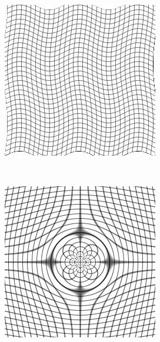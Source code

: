 \begin{figure}[H]
\begin{subfigure}[t]{0.3\textwidth}
	  \includegraphics[width=\textwidth]{figuras/gridSin.png}
	  \label{fig:ref-image}
	\end{subfigure} \\
	\begin{subfigure}[t]{0.3\textwidth}
	  \includegraphics[width=\textwidth]{figuras/gridDist.png}

\end{subfigure}
\end{figure}
